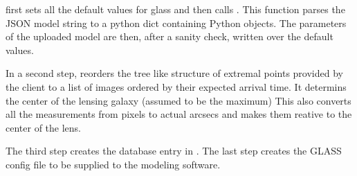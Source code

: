  first sets all the default values for glass and then calls .
This function parses the JSON model string to a python dict containing Python objects.
The parameters of the uploaded model are then, after a sanity check, written over the default values.

In a second step,  reorders the tree like structure of extremal points provided by the client to a list of images ordered by their expected arrival time. It determins the center of the lensing galaxy (assumed to be the maximum) This also converts all the measurements from \spl pixels to actual arcsecs and makes them reative to the center of the lens.

The third step  creates the database entry in .
The last step  creates the GLASS config file to be supplied to the modeling software.











